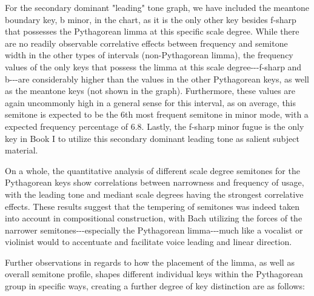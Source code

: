For the secondary dominant "leading" tone graph, we have included the
meantone boundary key, b minor, in the chart, as it is the only other
key besides f-sharp that possesses the Pythagorean limma at this
specific scale degree. While there are no readily observable correlative
effects between frequency and semitone width in the other types of
intervals (non-Pythagorean limma), the frequency values of the only keys
that possess the limma at this scale degree-\/-\/-f-sharp and
b-\/-\/-are considerably higher than the values in the other Pythagorean
keys, as well as the meantone keys (not shown in the graph).
Furthermore, these values are again uncommonly high in a general sense
for this interval, as on average, this semitone is expected to be the
6th most frequent semitone in minor mode, with a expected frequency
percentage of 6.8. Lastly, the f-sharp minor fugue is the only key in
Book I to utilize this secondary dominant leading tone as salient
subject material.



    \begin{center}
    \end{center}
    


    \begin{center}
    \end{center}
    
    On a whole, the quantitative analysis of different scale degree
semitones for the Pythagorean keys show correlations between narrowness
and frequency of usage, with the leading tone and mediant scale degrees
having the strongest correlative effects. These results suggest that the
tempering of semitones was indeed taken into account in compositional
construction, with Bach utilizing the forces of the narrower
semitones-\/-\/-especially the Pythagorean limma-\/-\/-much like a
vocalist or violinist would to accentuate and facilitate voice leading
and linear direction.

Further observations in regards to how the placement of the limma, as
well as overall semitone profile, shapes different individual keys
within the Pythagorean group in specific ways, creating a further degree
of key distinction are as follows:

